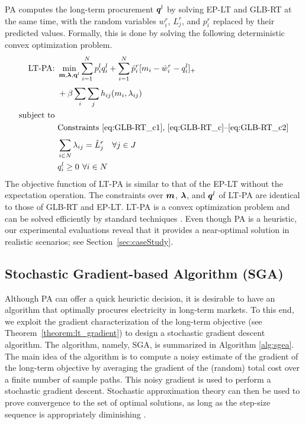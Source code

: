 PA computes the long-term procurement $\boldsymbol{q}^l$ by solving EP-LT
and GLB-RT at the same time, with the random variables $w^r_i$,
$L^r_j$, and $p^r_i$ replaced by their predicted values. Formally, this is done by solving the following deterministic convex optimization problem.
\begin{subequations}
	\begin{align*}
	\text{LT-PA: } & \min_{\mathbf{m}, \boldsymbol{\lambda}, \mathbf{q}^l} \sum_{i=1}^{N} p^l_i q^l_i + \sum_{i=1}^{N} \hat{p}^r_i [m_i - \hat{w}^r_i - q^l_i]_+ \nonumber \\
	&  + \beta  \sum_{i}^{}\sum_{j}^{}h_{ij}(m_i, \lambda_{ij}) \\
	\mbox{subject to } \nonumber \\
	&\text{Constraints \eqref{eq:GLB-RT_c1}, \eqref{eq:GLB-RT_c}--\eqref{eq:GLB-RT_c2}} \\
        &\sum_{i\in N}^{} \lambda_{ij} = \hat{L}^r_j \quad \forall j \in J \\
	&q^l_i \geq 0 \textbf{   } \forall i \in N
	\end{align*}
\end{subequations}
The objective function of LT-PA is similar to that of the EP-LT
without the expectation operation. The constraints over $\boldsymbol{m}$,
$\boldsymbol{\lambda}$, and $\boldsymbol{q}^l$ of LT-PA are identical to those
of GLB-RT and EP-LT. LT-PA is a convex
optimization problem and can be solved efficiently by standard
techniques \cite{boyd2004convex}. 
Even though PA is a heuristic, our experimental evaluations reveal
that it provides a near-optimal solution in realistic scenarios; see
Section~\ref{sec:caseStudy}.



\subsection{Stochastic Gradient-based Algorithm (SGA)}

Although PA can offer a quick heurictic decision, it is desirable to
have an algorithm that optimally procures electricity in long-term
markets. To this end, we exploit the gradient characterization of the
long-term objective (see Theorem~\ref{theorem:lt_gradient}) to design
a stochastic gradient descent algorithm. The algorithm, namely, SGA,
is summarized in Algorithm \ref{alg:sgea}. The main idea of the
algorithm is to compute a noisy estimate of the gradient of the
long-term objective by averaging the gradient of the (random) total
cost over a finite number of sample paths.
This noisy gradient is used to perform a stochastic gradient
descent. Stochastic approximation theory can then be used to prove
convergence to the set of optimal solutions, as long as the step-size
sequence is appropriately diminishing \cite{Kushner03}.


